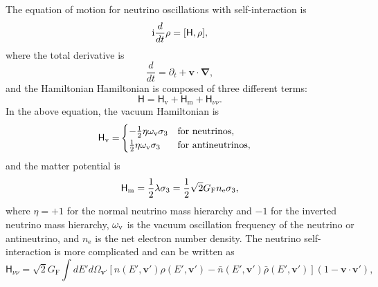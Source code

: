 The equation of motion for neutrino oscillations with self-interaction is\cite{Sigl1993}
\begin{equation}
   \ri \frac{d}{dt}\rho = [ \mathsf H,\rho],
   \label{chap:collective-sec:collective-eqn:equation-of-motion-general}
\end{equation}
where the total derivative is
\begin{equation}
   \frac{d}{dt} = \partial_t + \mathbf v\cdot \boldsymbol{\nabla},
\end{equation}
and the Hamiltonian Hamiltonian is composed of three different terms:
\begin{equation}
   \mathsf H = \mathsf H_{\mathrm v} + \mathsf H_{\mathrm m} +\mathsf  H_{\nu\nu}.
\end{equation}
In the above equation, the vacuum Hamiltonian is
\begin{align*}
    \mathsf H_\mathrm v =& \begin{cases}
    -\frac{1}{2}\eta \omega_\mathrm v \sigma_3 & \text{for neutrinos},\\
    \frac{1}{2}\eta \omega_\mathrm v \sigma_3 & \text{for antineutrinos},
    \end{cases}
\end{align*}
and the matter potential is 
\begin{equation}
    \mathsf H_\mathrm m = \frac{1}{2} \lambda \sigma_3  = \frac{1}{2} \sqrt{2}G_{\mathrm F} n_{\mathrm e} \sigma_3,
\end{equation}
where $\eta = +1$ for the normal neutrino mass hierarchy and $-1$ for the inverted neutrino mass hierarchy, $\omega_\mathrm v$ is the vacuum oscillation frequency of the neutrino or antineutrino, and $n_{\mathrm e}$ is the net electron number density. The neutrino self-interaction is more complicated and can be written as
\begin{equation}
    \mathsf H_{\nu\nu} = \sqrt{2}G_{\mathrm F} \int dE' d\Omega_{\mathbf v'} \left[ n(E',\mathbf v')\rho(E',\mathbf v') - \bar n(E',\mathbf v')\bar\rho(E',\mathbf v') \right] (1-\mathbf v \cdot \mathbf v'),
    \label{chap:collective-sec:collective-eqn:equation-of-motion-self-interaction}
\end{equation}
